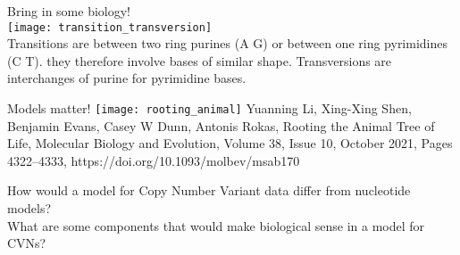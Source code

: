 \documentclass{beamer}
\begin{document}


\begin{frame}
Bring in some biology!\\
\texttt{[image: transition\_transversion]}\\
Transitions are between two ring purines (A G)
or between one ring pyrimidines (C T).
they therefore involve bases of similar shape. 
Transversions are interchanges of purine for pyrimidine bases.
\end{frame}








\begin{frame}
Models matter!
\texttt{[image: rooting\_animal]}
\tiny{Yuanning Li, Xing-Xing Shen, Benjamin Evans, Casey W Dunn, Antonis Rokas, Rooting the Animal Tree of Life, Molecular Biology and Evolution, Volume 38, Issue 10, October 2021, Pages 4322–4333, https://doi.org/10.1093/molbev/msab170
}
\end{frame}

\begin{frame}
\Large
How would a model for Copy Number Variant data differ from nucleotide models?\\
What are some components that would make biological sense in a model for CVNs?
\end{frame}
\end{document}
